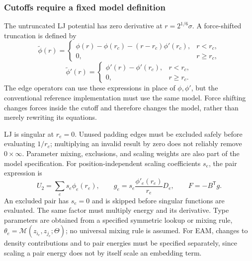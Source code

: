 \documentclass[11pt,a4paper]{article}
\theoremstyle{definition}
\begin{document}
\subsubsection{Cutoffs require a fixed model definition}
The untruncated LJ potential has zero derivative at $r=2^{1/6}\sigma$. A force-shifted
truncation is defined by~\cite{lammps-shift}
\begin{equation}
\widetilde\phi(r)=
\begin{cases}
\phi(r)-\phi(r_c)-(r-r_c)\phi'(r_c),&r<r_c,\\
0,&r\ge r_c,
\end{cases}
\label{eq:force-shift}
\end{equation}
\begin{equation}
\widetilde\phi'(r)=
\begin{cases}\phi'(r)-\phi'(r_c),&r<r_c,\\0,&r\ge r_c.\end{cases}
\end{equation}
The edge operators can use these expressions in place of $\phi,\phi'$, but the conventional
reference implementation must use the same model. Force shifting changes forces inside the
cutoff and therefore changes the model, rather than merely rewriting its equations.

LJ is singular at $r_e=0$. Unused padding edges must be excluded safely before evaluating
$1/r_e$; multiplying an invalid result by zero does not reliably remove $0\times\infty$.
Parameter mixing, exclusions, and scaling weights are also part of the model specification.
For position-independent scaling coefficients $s_e$, the pair expression is
\begin{equation}
U_2=\sum_e s_e\phi_e(r_e),\qquad
g_e=s_e\frac{\phi'_e(r_e)}{r_e}D_e,\qquad F=-B^{\mathsf T}g.
\label{eq:pair-scaling}
\end{equation}
An excluded pair has $s_e=0$ and is skipped before singular functions are evaluated. The same
factor must multiply energy and its derivative. Type parameters are obtained from a specified
symmetric lookup or mixing rule, $\theta_e=\mathcal M(z_{i_e},z_{j_e};\Theta)$; no universal
mixing rule is assumed. For EAM, changes to density contributions and to pair energies must be
specified separately, since scaling a pair energy does not by itself scale an embedding term.
\end{document}

